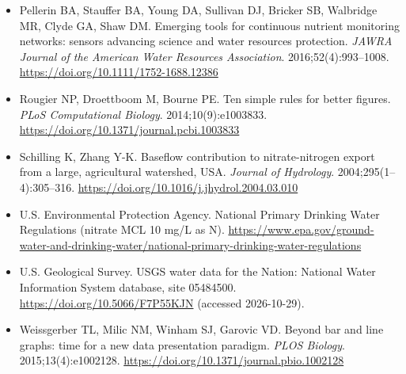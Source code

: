 \begin{itemize}
\item Pellerin BA, Stauffer BA, Young DA, Sullivan DJ, Bricker SB, Walbridge MR, Clyde GA, Shaw DM. Emerging tools for continuous nutrient monitoring networks: sensors advancing science and water resources protection. \textit{JAWRA Journal of the American Water Resources Association}. 2016;52(4):993--1008. \url{https://doi.org/10.1111/1752-1688.12386}
\item Rougier NP, Droettboom M, Bourne PE. Ten simple rules for better figures. \textit{PLoS Computational Biology}. 2014;10(9):e1003833. \url{https://doi.org/10.1371/journal.pcbi.1003833}
\item Schilling K, Zhang Y-K. Baseflow contribution to nitrate-nitrogen export from a large, agricultural watershed, USA. \textit{Journal of Hydrology}. 2004;295(1--4):305--316. \url{https://doi.org/10.1016/j.jhydrol.2004.03.010}
\item U.S. Environmental Protection Agency. National Primary Drinking Water Regulations (nitrate MCL 10 mg/L as N). \url{https://www.epa.gov/ground-water-and-drinking-water/national-primary-drinking-water-regulations}
\item U.S. Geological Survey. USGS water data for the Nation: National Water Information System database, site 05484500. \url{https://doi.org/10.5066/F7P55KJN} (accessed 2026-10-29).
\item Weissgerber TL, Milic NM, Winham SJ, Garovic VD. Beyond bar and line graphs: time for a new data presentation paradigm. \textit{PLOS Biology}. 2015;13(4):e1002128. \url{https://doi.org/10.1371/journal.pbio.1002128}
\end{itemize}
